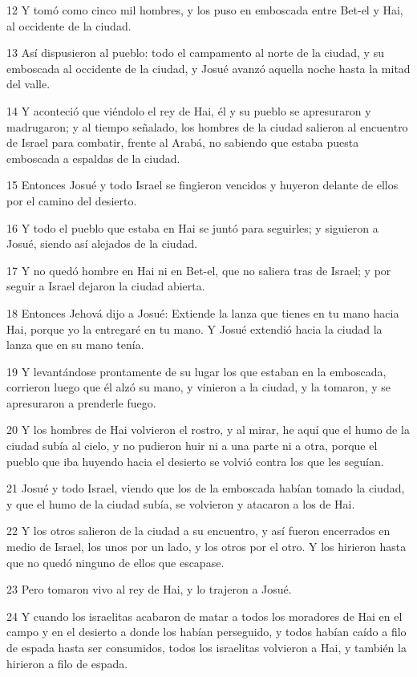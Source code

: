 \par 12 Y tomó como cinco mil hombres, y los puso en emboscada entre Bet-el y Hai, al occidente de la ciudad.
\par 13 Así dispusieron al pueblo: todo el campamento al norte de la ciudad, y su emboscada al occidente de la ciudad, y Josué avanzó aquella noche hasta la mitad del valle.
\par 14 Y aconteció que viéndolo el rey de Hai, él y su pueblo se apresuraron y madrugaron; y al tiempo señalado, los hombres de la ciudad salieron al encuentro de Israel para combatir, frente al Arabá, no sabiendo que estaba puesta emboscada a espaldas de la ciudad.
\par 15 Entonces Josué y todo Israel se fingieron vencidos y huyeron delante de ellos por el camino del desierto.
\par 16 Y todo el pueblo que estaba en Hai se juntó para seguirles; y siguieron a Josué, siendo así alejados de la ciudad. 
\par 17 Y no quedó hombre en Hai ni en Bet-el, que no saliera tras de Israel; y por seguir a Israel dejaron la ciudad abierta.
\par 18 Entonces Jehová dijo a Josué: Extiende la lanza que tienes en tu mano hacia Hai, porque yo la entregaré en tu mano. Y Josué extendió hacia la ciudad la lanza que en su mano tenía.
\par 19 Y levantándose prontamente de su lugar los que estaban en la emboscada, corrieron luego que él alzó su mano, y vinieron a la ciudad, y la tomaron, y se apresuraron a prenderle fuego.
\par 20 Y los hombres de Hai volvieron el rostro, y al mirar, he aquí que el humo de la ciudad subía al cielo, y no pudieron huir ni a una parte ni a otra, porque el pueblo que iba huyendo hacia el desierto se volvió contra los que les seguían.
\par 21 Josué y todo Israel, viendo que los de la emboscada habían tomado la ciudad, y que el humo de la ciudad subía, se volvieron y atacaron a los de Hai.
\par 22 Y los otros salieron de la ciudad a su encuentro, y así fueron encerrados en medio de Israel, los unos por un lado, y los otros por el otro. Y los hirieron hasta que no quedó ninguno de ellos que escapase.
\par 23 Pero tomaron vivo al rey de Hai, y lo trajeron a Josué.
\par 24 Y cuando los israelitas acabaron de matar a todos los moradores de Hai en el campo y en el desierto a donde los habían perseguido, y todos habían caído a filo de espada hasta ser consumidos, todos los israelitas volvieron a Hai, y también la hirieron a filo de espada.

